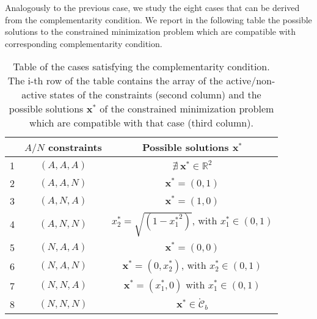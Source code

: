 \documentclass[a4paper,11pt]{article}
\begin{document}
\noindent Analogously to the previous case, we study the eight cases that can be derived from the complementarity condition. We report in the following table the possible solutions to the constrained minimization problem which are compatible with corresponding complementarity condition.
\begin{table}[H]
	\centering
	\begin{tabular}{|c|c|c|}
		\hline
		& $A/N$ constraints & Possible solutions $\textbf{x}^*$ \\
		\hline
		1 & $(A, A, A)$ & $\nexists \ \textbf{x}^* \in \mathbb{R}^{2}$\\
		2 & $(A, A, N)$ & $\textbf{x}^* = (0,1)$\\
		3 & $(A, N, A)$ & $\textbf{x}^* = (1,0)$\\
		4 & $(A, N, N)$ & $x_{2}^* = \sqrt{(1-{x_{1}^*}^2)}$, with $x_{1}^* \in (0,1)$\\
		5 & $(N, A, A)$ & $\textbf{x}^* = (0,0)$\\
		6 & $(N, A, N)$ & $\textbf{x}^* = (0,x_{2}^*)$, with $x_{2}^* \in (0,1)$\\
		7 & $(N, N, A)$ & $\textbf{x}^* = (x_{1}^*,0)$ with $x_{1}^* \in (0,1)$\\
		8 & $(N, N, N)$ & $\textbf{x}^* \in \mathring{\mathcal{C}}_{b}$\\
		\hline
	\end{tabular}
	\caption{Table of the cases satisfying the complementarity condition. The i-th row of the table contains the array of the active/non-active states of the constraints (second column) and the possible solutions $\textbf{x}^*$ of the constrained minimization problem which are compatible with that case (third column).}
	\label{tab:complementarity conditions f_b}
\end{table}
\end{document}
